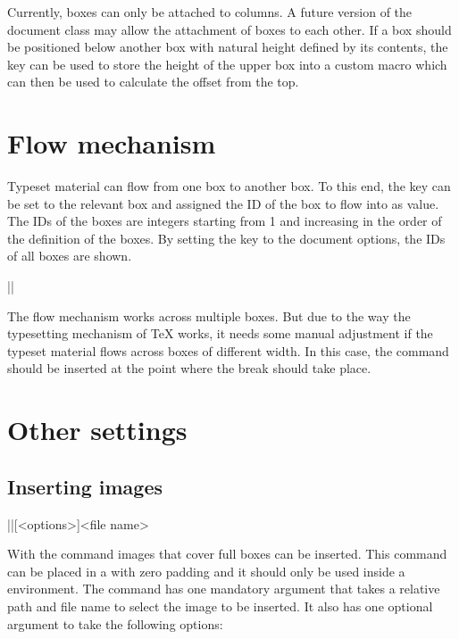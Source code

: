 \documentclass[a4paper]{article}
\begin{document}
Currently, boxes can only be attached to columns. A future version of the document class may allow the attachment of boxes to each other. If a box should be positioned below another box with natural height defined by its contents, the  key can be used to store the height of the upper box into a custom macro which can then be used to calculate the offset from the top.

\section{Flow mechanism}\label{sec:flow}

Typeset material can flow from one box to another box. To this end, the key  can be set to the relevant box and assigned the ID of the box to flow into as value. The IDs of the boxes are integers starting from 1 and increasing in the order of the definition of the boxes. By setting the key  to the document options, the IDs of all boxes are shown.

\begin{macrodef}
|\leporelloboxbreak|
\end{macrodef}
The flow mechanism works across multiple boxes. But due to the way the typesetting mechanism of TeX works, it needs some manual adjustment if the typeset material flows across boxes of different width. In this case, the command \macro{\leporelloboxbreak} should be inserted at the point where the break should take place.

\section{Other settings}

\subsection{Inserting images}

\begin{macrodef}
|\leporelloimage|[<options>]{<file name>}
\end{macrodef}
With the command \macro{\leporelloimage} images that cover full boxes can be inserted. This command can be placed in a  with zero padding and it should only be used inside a  environment. The command has one mandatory argument that takes a relative path and file name to select the image to be inserted. It also has one optional argument to take the following options:
\end{document}
